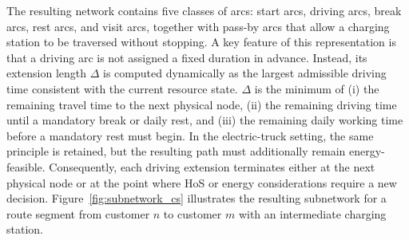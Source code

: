 \documentclass[3p,11pt,authoryear]{elsarticle}  %
\begin{document}
The resulting network contains five classes of arcs: start arcs, driving arcs, break arcs, rest arcs, and visit arcs, together with pass-by arcs that allow a charging station to be traversed without stopping. A key feature of this representation is that a driving arc is not assigned a fixed duration in advance. Instead, its extension length \(\Delta\) is computed dynamically as the largest admissible driving time consistent with the current resource state. \(
\Delta
\)
is the minimum of (i) the remaining travel time to the next physical node, (ii) the remaining driving time until a mandatory break or daily rest, and (iii) the remaining daily working time before a mandatory rest must begin. In the electric-truck setting, the same principle is retained, but the resulting path must additionally remain energy-feasible. Consequently, each driving extension terminates either at the next physical node or at the point where HoS or energy considerations require a new decision. Figure~\ref{fig:subnetwork_cs} illustrates the resulting subnetwork for a route segment from customer \(n\) to customer \(m\) with an intermediate charging station.
\end{document}
